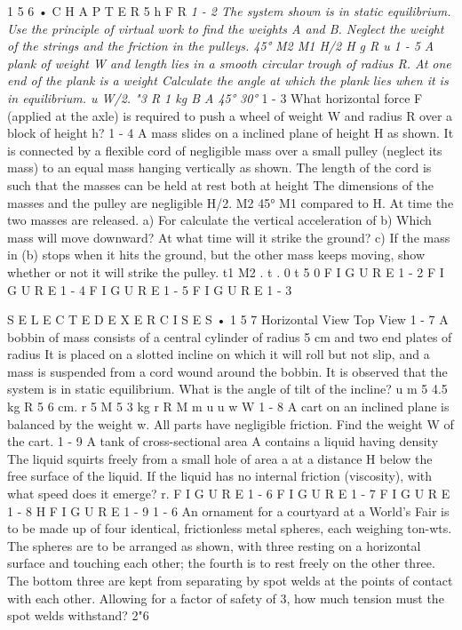 \documentclass[10pt,oneside]{article}
\begin{document}
1 5 6 • C H A P T E R  5 h F R \emph{ 1 - 2 The system shown is in static equilibrium. Use the principle of virtual work to find the weights A and B. Neglect the weight of the strings and the friction in the pulleys. 45° M2 M1 H/2 H g R u } \emph{ 1 - 5 A plank of weight W and length lies in a smooth circular trough of radius R. At one end of the plank is a weight Calculate the angle at which the plank lies when it is in equilibrium. u W/2. "3 R 1 kg B A 45° 30° } 1 - 3 What horizontal force F (applied at the axle) is required to push a wheel of weight W and radius R over a block of height h? \emph{ } 1 - 4 A mass slides on a inclined plane of height H as shown. It is connected by a flexible cord of negligible mass over a small pulley (neglect its mass) to an equal mass hanging vertically as shown. The length of the cord is such that the masses can be held at rest both at height The dimensions of the masses and the pulley are negligible H/2. M2 45° M1 compared to H. At time the two masses are released. a) For calculate the vertical acceleration of b) Which mass will move downward? At what time will it strike the ground? c) If the mass in (b) stops when it hits the ground, but the other mass keeps moving, show whether or not it will strike the pulley. t1 M2 . t . 0 t 5 0 F I G U R E  1 - 2 F I G U R E  1 - 4 F I G U R E  1 - 5 F I G U R E  1 - 3\par

S E L E C T E D  E X E R C I S E S • 1 5 7 Horizontal View Top View \emph{ } 1 - 7 A bobbin of mass consists of a central cylinder of radius 5 cm and two end plates of radius It is placed on a slotted incline on which it will roll but not slip, and a mass is suspended from a cord wound around the bobbin. It is observed that the system is in static equilibrium. What is the angle of tilt of the incline? u m 5 4.5 kg R 5 6 cm. r 5 M 5 3 kg r R M m u u w W \emph{ } 1 - 8 A cart on an inclined plane is balanced by the weight w. All parts have negligible friction. Find the weight W of the cart. \emph{ } 1 - 9 A tank of cross-sectional area A contains a liquid having density The liquid squirts freely from a small hole of area a at a distance H below the free surface of the liquid. If the liquid has no internal friction (viscosity), with what speed does it emerge? r. F I G U R E  1 - 6 F I G U R E  1 - 7 F I G U R E  1 - 8 H F I G U R E  1 - 9 \emph{ } 1 - 6 An ornament for a courtyard at a World’s Fair is to be made up of four identical, frictionless metal spheres, each weighing ton-wts. The spheres are to be arranged as shown, with three resting on a horizontal surface and touching each other; the fourth is to rest freely on the other three. The bottom three are kept from separating by spot welds at the points of contact with each other. Allowing for a factor of safety of 3, how much tension must the spot welds withstand? 2"6\par
\end{document}
